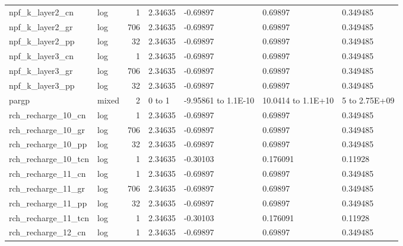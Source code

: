 \documentclass{article}
\begin{document}
\begin{center}
\begin{landscape}
\begin{longtable}{llrllll}
    npf\_k\_layer2\_cn &       log &      1 &        2.34635 &            -0.69897 &            0.69897 &           0.349485 \\
    npf\_k\_layer2\_gr &       log &    706 &        2.34635 &            -0.69897 &            0.69897 &           0.349485 \\
    npf\_k\_layer2\_pp &       log &     32 &        2.34635 &            -0.69897 &            0.69897 &           0.349485 \\
    npf\_k\_layer3\_cn &       log &      1 &        2.34635 &            -0.69897 &            0.69897 &           0.349485 \\
    npf\_k\_layer3\_gr &       log &    706 &        2.34635 &            -0.69897 &            0.69897 &           0.349485 \\
    npf\_k\_layer3\_pp &       log &     32 &        2.34635 &            -0.69897 &            0.69897 &           0.349485 \\
              pargp &     mixed &      2 &     0 to     1 & -9.95861 to 1.1E-10 & 10.0414 to 1.1E+10 &      5 to 2.75E+09 \\
 rch\_recharge\_10\_cn &       log &      1 &        2.34635 &            -0.69897 &            0.69897 &           0.349485 \\
 rch\_recharge\_10\_gr &       log &    706 &        2.34635 &            -0.69897 &            0.69897 &           0.349485 \\
 rch\_recharge\_10\_pp &       log &     32 &        2.34635 &            -0.69897 &            0.69897 &           0.349485 \\
rch\_recharge\_10\_tcn &       log &      1 &        2.34635 &            -0.30103 &           0.176091 &            0.11928 \\
 rch\_recharge\_11\_cn &       log &      1 &        2.34635 &            -0.69897 &            0.69897 &           0.349485 \\
 rch\_recharge\_11\_gr &       log &    706 &        2.34635 &            -0.69897 &            0.69897 &           0.349485 \\
 rch\_recharge\_11\_pp &       log &     32 &        2.34635 &            -0.69897 &            0.69897 &           0.349485 \\
rch\_recharge\_11\_tcn &       log &      1 &        2.34635 &            -0.30103 &           0.176091 &            0.11928 \\
 rch\_recharge\_12\_cn &       log &      1 &        2.34635 &            -0.69897 &            0.69897 &           0.349485 \\

\end{longtable}
\end{landscape}
\end{center}
\end{document}
